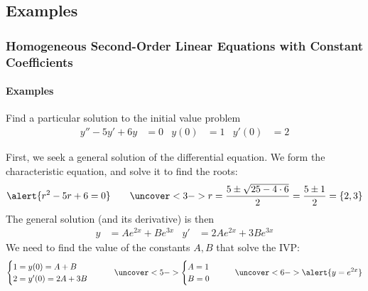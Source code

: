 \documentclass[9pt,xcolor=x11names,compress]{beamer}
\begin{document}
\subsection{Examples}
\begin{frame}\frametitle{Homogeneous Second-Order Linear Equations with Constant Coefficients}
\framesubtitle{Examples}
\begin{block}
	{Find a particular solution to the initial value problem}
	\begin{align*}
		y''-5y'+6y&=0 &y(0)&=1 &y'(0)&=2
	\end{align*}
\end{block}
\pause First, we seek a general solution of the differential equation.  We form the characteristic equation, and solve it to find the roots:
\begin{equation*}
	\alert{r^2-5r+6=0}\qquad 
	\uncover<3->{r=\frac{5\pm \sqrt{25-4\cdot 6}}{2}=\frac{5\pm 1}{2}=\{ 2,3 \}}
\end{equation*}
\pause The general solution (and its derivative) is then 
\begin{align*}
	y&=Ae^{2x}+Be^{3x} & y'&=2Ae^{2x}+3Be^{3x} 
\end{align*}
\pause We need to find the value of the constants $A,B$ that solve the IVP:
\begin{equation*}
\begin{cases}
	1=y(0)=A+B \\ 2=y'(0)=2A+3B
\end{cases}\qquad
\uncover<5->{\begin{cases}
	A=1 \\B=0
\end{cases}\qquad}
\uncover<6->{\alert{y=e^{2x}}}
\end{equation*}
\end{frame}
\end{document}
